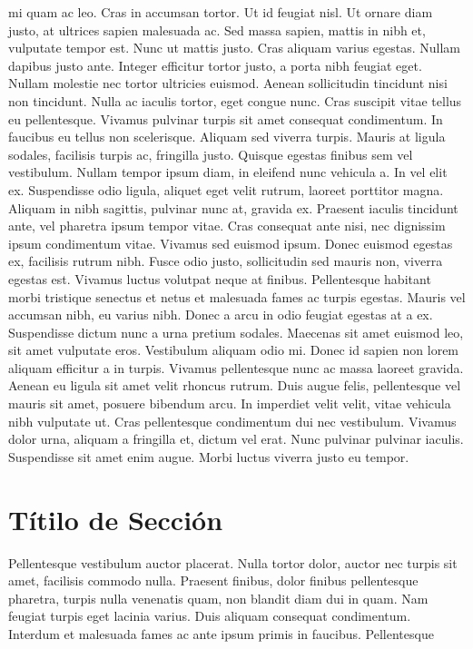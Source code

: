 mi quam ac leo. Cras in accumsan tortor. Ut id feugiat nisl. Ut ornare diam
justo, at ultrices sapien malesuada ac. Sed massa sapien, mattis in nibh et,
vulputate tempor est. Nunc ut mattis justo. Cras aliquam varius egestas. Nullam
dapibus justo ante. Integer efficitur tortor justo, a porta nibh feugiat eget.
Nullam molestie nec tortor ultricies euismod. Aenean sollicitudin tincidunt nisi
non tincidunt. Nulla ac iaculis tortor, eget congue nunc. Cras suscipit vitae
tellus eu pellentesque. Vivamus pulvinar turpis sit amet consequat condimentum.
In faucibus eu tellus non scelerisque. Aliquam sed viverra turpis. Mauris at
ligula sodales, facilisis turpis ac, fringilla justo. Quisque egestas finibus
sem vel vestibulum. Nullam tempor ipsum diam, in eleifend nunc vehicula a. In
vel elit ex. Suspendisse odio ligula, aliquet eget velit rutrum, laoreet
porttitor magna. Aliquam in nibh sagittis, pulvinar nunc at, gravida ex.
Praesent iaculis tincidunt ante, vel pharetra ipsum tempor vitae. Cras consequat
ante nisi, nec dignissim ipsum condimentum vitae. Vivamus sed euismod ipsum.
Donec euismod egestas ex, facilisis rutrum nibh. Fusce odio justo, sollicitudin
sed mauris non, viverra egestas est. Vivamus luctus volutpat neque at finibus.
Pellentesque habitant morbi tristique senectus et netus et malesuada fames ac
turpis egestas. Mauris vel accumsan nibh, eu varius nibh. Donec a arcu in odio
feugiat egestas at a ex. Suspendisse dictum nunc a urna pretium sodales.
Maecenas sit amet euismod leo, sit amet vulputate eros. Vestibulum aliquam odio
mi. Donec id sapien non lorem aliquam efficitur a in turpis. Vivamus
pellentesque nunc ac massa laoreet gravida. Aenean eu ligula sit amet velit
rhoncus rutrum. Duis augue felis, pellentesque vel mauris sit amet, posuere
bibendum arcu. In imperdiet velit velit, vitae vehicula nibh vulputate ut. Cras
pellentesque condimentum dui nec vestibulum. Vivamus dolor urna, aliquam a
fringilla et, dictum vel erat. Nunc pulvinar pulvinar iaculis. Suspendisse sit
amet enim augue. Morbi luctus viverra justo eu tempor. \section{Títilo de
Sección} Pellentesque vestibulum auctor placerat. Nulla tortor dolor, auctor nec
turpis sit amet, facilisis commodo nulla. Praesent finibus, dolor finibus
pellentesque pharetra, turpis nulla venenatis quam, non blandit diam dui in quam.
Nam feugiat turpis eget lacinia varius. Duis aliquam consequat condimentum.
Interdum et malesuada fames ac ante ipsum primis in faucibus. Pellentesque
